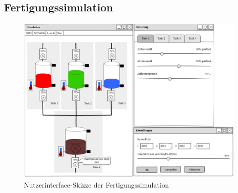 \documentclass[parskip=full]{scrartcl}
\begin{document}
\subsection{Fertigungssimulation}
\begin{figure}[h!]
  \centering
  \includegraphics[scale=0.5]{media/ui-sketch-server.png}
  \caption{Nutzerinterface-Skizze der Fertigungssimulation}
\end{figure}
\pagebreak
\end{document}
